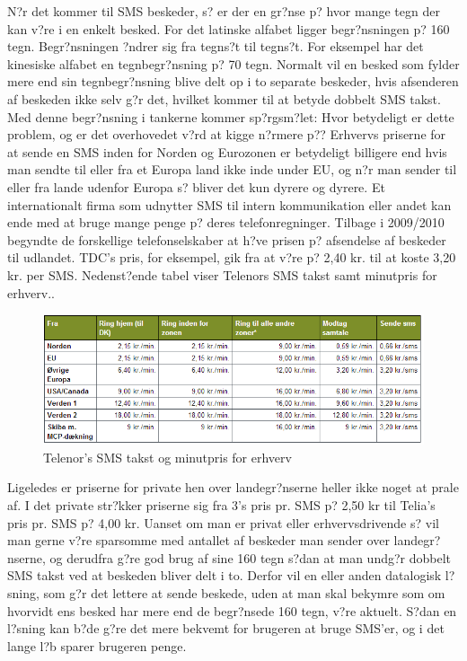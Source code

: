 N?r det kommer til SMS beskeder, s? er der en gr?nse p? hvor mange tegn der kan v?re i en enkelt besked. For det latinske alfabet ligger begr?nsningen p? 160 tegn. Begr?nsningen ?ndrer sig fra tegns?t til tegns?t. For eksempel har det kinesiske alfabet en tegnbegr?nsning p? 70 tegn.\cite{Pro_1} Normalt vil en besked som fylder mere end sin tegnbegr?nsning blive delt op i to separate beskeder, hvis afsenderen af beskeden ikke selv g?r det, hvilket kommer til at betyde dobbelt SMS takst. Med denne begr?nsning i tankerne kommer sp?rgsm?let: Hvor betydeligt er dette problem, og er det overhovedet v?rd at kigge n?rmere p??
Erhvervs priserne for at sende en SMS inden for Norden og Eurozonen er betydeligt billigere end hvis man sendte til eller fra et Europa land ikke inde under EU, og n?r man sender til eller fra lande udenfor Europa s? bliver det kun dyrere og dyrere. Et internationalt firma som udnytter SMS til intern kommunikation eller andet kan ende med at bruge mange penge p? deres telefonregninger. Tilbage i 2009/2010 begyndte de forskellige telefonselskaber at h?ve prisen p? afsendelse af beskeder til udlandet. TDC's pris, for eksempel, gik fra at v?re p? 2,40 kr. til at koste 3,20 kr. per SMS.\cite{Pro_2} Nedenst?ende tabel viser Telenors SMS takst samt minutpris for erhverv.\cite{Pro_3}.

\begin{figure}[H]
\centering
\includegraphics[width=\linewidth]{Billeder/Priser}
\caption {Telenor's SMS takst og minutpris for erhverv}
\centering
\end{figure}


Ligeledes er priserne for private hen over landegr?nserne heller ikke noget at prale af. I det private str?kker priserne sig fra 3's pris pr. SMS p? 2,50 kr\cite{Pro_4} til Telia's pris pr. SMS p? 4,00 kr.\cite{Pro_5} Uanset om man er privat eller erhvervsdrivende s? vil man gerne v?re sparsomme med antallet af beskeder man sender over landegr?nserne, og derudfra g?re god brug af sine 160 tegn s?dan at man undg?r dobbelt SMS takst ved at beskeden bliver delt i to.
Derfor vil en eller anden datalogisk l?sning, som g?r det lettere at sende beskede, uden at man skal bekymre som om hvorvidt ens besked har mere end de begr?nsede 160 tegn, v?re aktuelt. S?dan en l?sning kan b?de g?re det mere bekvemt for brugeren at bruge SMS'er, og i det lange l?b sparer brugeren penge.
